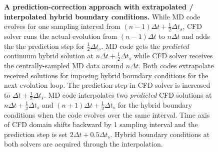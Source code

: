 \documentclass[preprint,12pt]{elsarticle}
\begin{document}
\begin{figure}
\centering
{}
\hskip 1cm
\hskip 1cm
\caption[]{\small {\bf A prediction-correction approach with extrapolated / interpolated hybrid boundary conditions.} 
 While MD code evolves for one sampling interval from
$(n-1){\Delta}t + \frac{1}{2}{\Delta}{t_s}$, CFD solver runs the actual evolution
from $(n-1){\Delta}t$ to $n{\Delta}t$ and adds the the prediction step
for $\frac{1}{2}{\Delta}{t_s}$. MD code gets the \textit{predicted} continuum hybrid solution
at $n{\Delta}t + \frac{1}{2}{\Delta}{t_s}$ while CFD solver receives the
centrally-sampled MD data around $n{\Delta}t$. Both codes extrapolate received solutions
for imposing hybrid boundary conditions for the next evolution loop.
 The prediction step in CFD solver is increased to
${\Delta}t + \frac{1}{2}{\Delta}{t_s}$. MD code interpolates two \textit{predicted}
CFD solutions at $n{\Delta}t + \frac{1}{2}{\Delta}{t_s}$ and
$(n+1){\Delta}t + \frac{1}{2}{\Delta}{t_s}$ for the hybrid boundary conditions
when the code evolves over the same interval.
 Time axis of CFD domain shifts backward by 1 sampling
interval and the prediction step is set $2{\Delta}t + 0.5{\Delta}{t_s}$.
Hybrid boundary conditions at both solvers are acquired through the interpolation.}
\label{Hybrid_Timescale2}
\end{figure}
\end{document}
